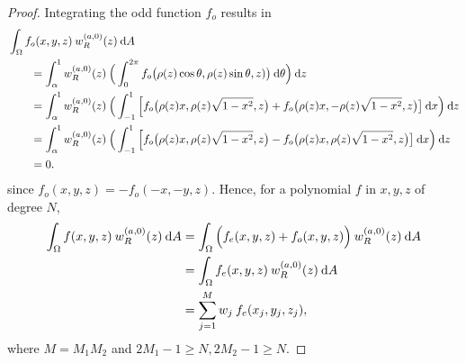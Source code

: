 \documentclass[11pt, oneside]{article}   	%
\begin{document}
\begin{proof}
Integrating the odd function $f_o$ results in
\begin{align*}
	&\int_\Omega f_o(x,y,z) \: w_R^{(a,0)}(z) \: {\rm d} A \\
	&\quad \quad = \int_\alpha^1 w_R^{(a,0)}(z) \: \Big( \int_0^{2\pi} f_o\big(\rho(z)\cos\theta,\rho(z)\sin\theta, z)\big) \: {\rm d} \theta \Big) \: {\rm d} z \\
	&\quad \quad = \int_\alpha^1 w_R^{(a,0)}(z) \: \Big( \int_{-1}^1 \Big[ f_o\big(\rho(z)x,\rho(z)\sqrt{1-x^2}, z\big) + f_o\big(\rho(z)x, - \rho(z)\sqrt{1-x^2}, z\big) \big] \: {\rm d} x \Big) \: {\rm d} z \\
	&\quad \quad = \int_\alpha^1 w_R^{(a,0)}(z) \: \Big( \int_{-1}^1 \Big[ f_o\big(\rho(z)x,\rho(z)\sqrt{1-x^2}, z\big) - f_o\big(\rho(z)x, \rho(z)\sqrt{1-x^2}, z\big) \big] \: {\rm d} x \Big) \: {\rm d} z \\
	&\quad \quad = 0.
\end{align*}
since $f_o(x,y,z) = - f_o(-x, -y, z)$. Hence, for a polynomial $f$ in $x,y,z$ of degree $N$,
\begin{align*}
	\int_\Omega f(x,y,z) \: w_R^{(a,0)}(z) \: {\rm d} A &= \int_\Omega \Big(f_e(x,y,z) + f_o(x,y,z)\Big) \:  w_R^{(a,0)}(z) \: {\rm d} A  \\
	&= \int_\Omega f_e(x,y,z) \: w_R^{(a,0)}(z) \: {\rm d} A \\
	&= \sum_{j=1}^{M}  w_j \: f_e(x_j, y_j, z_j),
\end{align*}
where $M = M_1 M_2$ and $2M_1 - 1 \ge N, 2M_2 - 1 \ge N$.
\end{proof}
\end{document}
